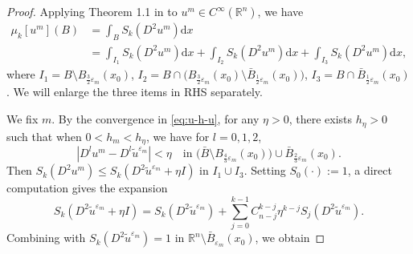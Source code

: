 \documentclass[reqno]{amsart}
\theoremstyle{remark}
\theoremstyle{definition}
\numberwithin{equation}{section}
\begin{document}
\begin{proof}
Applying Theorem 1.1 in \cite{Trudinger-Wang-II} to $u^m\in C^\infty(\mathbb{R}^n)$, we have
\[
\begin{split}
\mu_k[u^m](B) & =\int_{B}S_k(D^2u^m)\mathrm{d}x \\
& = \int_{I_1} S_k(D^2u^m) \mathrm{d}x + \int_{I_2} S_k(D^2u^m) \mathrm{d}x + \int_{I_3} S_k(D^2u^m) \mathrm{d}x,
\end{split}
\]
where $I_1=B \setminus B_{\frac{3}{2}\varepsilon_m}(x_0)$, $I_2=B \cap \big(B_{\frac{3}{2}\varepsilon_m}(x_0) \setminus \bar{B}_{\frac{1}{2}\varepsilon_m}(x_0)\big)$, $I_3=B \cap \bar{B}_{\frac{1}{2}\varepsilon_m}(x_0)$. We will enlarge the three items in RHS separately.

We fix $m$. By the convergence in \eqref{eq:u-h-u},  for any \( \eta > 0 \), there exists \( h_{\eta} > 0 \) such that when \( 0 < h_m < h_{\eta} \), we have for $l=0, 1, 2$,
\[
|D^lu^m - D^l\tilde{u}^{\varepsilon_m}| < \eta \quad \text{in }  \big(\bar{B} \setminus B_{\frac{4}{3}\varepsilon_m}(x_0)\big) \cup \bar{B}_{\frac{2}{3}\varepsilon_m}(x_0).
\]
Then $S_k(D^2u^m)\leq S_k(D^2 \tilde{u}^{\varepsilon_m} + \eta I)$ in $I_1\cup I_3$. Setting $S_0(\cdot):=1$, a direct computation gives the expansion 
$$S_k(D^2 \tilde{u}^{\varepsilon_m} + \eta I) = S_k(D^2 \tilde{u}^{\varepsilon_m}) + \sum_{j=0}^{k-1} C_{n-j}^{k-j} \eta^{k-j} S_j(D^2 \tilde{u}^{\varepsilon_m}).$$ 
Combining with $S_k(D^2\tilde{u}^{\varepsilon_m})=1$ in $\mathbb{R}^n\setminus\bar{B}_{\varepsilon_m}(x_0)$, we obtain

\end{proof}
\end{document}
